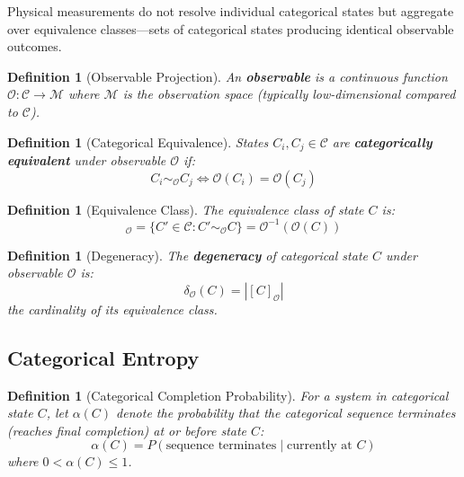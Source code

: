 \documentclass[11pt]{article}
\newtheorem{definition}[theorem]{Definition}
\theoremstyle{remark}
\begin{document}
Physical measurements do not resolve individual categorical states but aggregate over equivalence classes—sets of categorical states producing identical observable outcomes.

\begin{definition}[Observable Projection]
\label{def:observable}
An \textbf{observable} is a continuous function $\mathcal{O}: \mathcal{C} \to \mathcal{M}$ where $\mathcal{M}$ is the observation space (typically low-dimensional compared to $\mathcal{C}$).
\end{definition}

\begin{definition}[Categorical Equivalence]
\label{def:equivalence}
States $C_i, C_j \in \mathcal{C}$ are \textbf{categorically equivalent} under observable $\mathcal{O}$ if:
\begin{equation}
C_i \sim_{\mathcal{O}} C_j \iff \mathcal{O}(C_i) = \mathcal{O}(C_j)
\end{equation}
\end{definition}

\begin{definition}[Equivalence Class]
The equivalence class of state $C$ is:
\begin{equation}
[C]_{\mathcal{O}} = \{C' \in \mathcal{C} : C' \sim_{\mathcal{O}} C\} = \mathcal{O}^{-1}(\mathcal{O}(C))
\end{equation}
\end{definition}

\begin{definition}[Degeneracy]
\label{def:degeneracy}
The \textbf{degeneracy} of categorical state $C$ under observable $\mathcal{O}$ is:
\begin{equation}
\delta_{\mathcal{O}}(C) = |[C]_{\mathcal{O}}|
\end{equation}
the cardinality of its equivalence class.
\end{definition}

\subsection{Categorical Entropy}

\begin{definition}[Categorical Completion Probability]
\label{def:completion_probability}
For a system in categorical state $C$, let $\alpha(C)$ denote the probability that the categorical sequence terminates (reaches final completion) at or before state $C$:
\begin{equation}
\alpha(C) = P(\text{sequence terminates} \mid \text{currently at } C)
\end{equation}
where $0 < \alpha(C) \leq 1$.
\end{definition}
\end{document}
